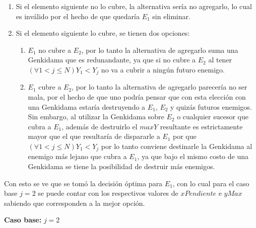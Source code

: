 \begin{enumerate}
{			\begin{enumerate}
				\item{
					Si el elemento siguiente no lo cubre, la alternativa
					sería no agregarlo, lo cual es inválido por el hecho de que
					quedaría $E_1$ sin eliminar.
				}
				\item{
					Si el elemento siguiente lo cubre, se tienen dos opciones:
					\begin{enumerate}
						\item{
							$E_1$ no cubre a $E_2$, por lo tanto la alternativa de
							agregarlo suma una Genkidama que es
							redunandante, ya que si no cubre a $E_2$ al tener
							$(\forall 1 < j \leq N) Y_1 < Y_j$ no va a cubrir a
							ningún futuro enemigo.
						}
						\item{
							$E_1$ cubre a $E_2$, por lo tanto la alternativa de
							agregarlo parecería no ser mala, por el hecho de que
							uno podría pensar que con esta elección con una
							Genkidama estaría destruyendo a $E_1$, $E_2$ y
							quizás futuros enemigos. Sin embargo, al utilizar la
							Genkidama sobre $E_2$ o cualquier sucesor que cubra
							a $E_1$, además de destruirlo el $maxY$
							resultante es estrictamente mayor que el que
							resultaría de dispararle a $E_1$ por que $(\forall 1
							< j \leq N) Y_1 < Y_j$ por lo tanto conviene
							destinarle la Genkidama al enemigo más lejano que
							cubra a $E_1$, ya que bajo el mismo costo de una
							Genkidama se tiene la posibilidad de destruir más
							enemigos.
						}
					\end{enumerate}
				}
			\end{enumerate}

			Con esto se ve que se tomó la decisión óptima para $E_1$, con lo
			cual para el caso base $j = 2$ se puede contar con los respectivos
			valores de $xPendiente$ e $yMax$ sabiendo que corresponden a la
			mejor opción.

			\textbf{Caso base:} $j = 2$

}
\end{enumerate}
